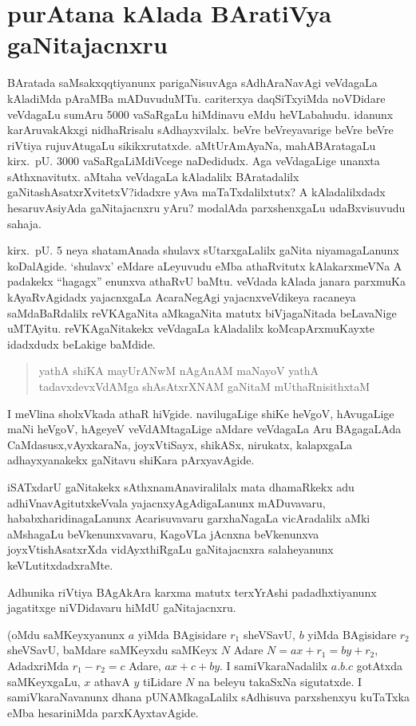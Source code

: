 \chapter{purAtana kAlada BAratiVya gaNitajacnxru}

 BAratada saMsakxqqtiyanunx parigaNisuvAga sAdhAraNavAgi veVdagaLa kAladiMda pAraMBa mADuvuduMTu. cariterxya daqSiTxyiMda noVDidare veVdagaLu sumAru {\rm 5000} vaSaRgaLu hiMdinavu eMdu heVLabahudu. idanunx karAruvakAkxgi nidhaRrisalu sAdhayx\-vilalx. beVre beVreyavarige beVre beVre riVtiya rujuvAtugaLu sikikxrutatxde. aMtU\break rAmAyaNa, mahABAratagaLu kirx.~pU. {\rm 3000} vaSaRgaLiMdiVcege naDedidudx. Aga veVdagaLige unanxta sAthxnavitutx. aMtaha veVdagaLa kAladalilx BAratadalilx gaNitashAsatxrXvitetxV?\break idadxre yAva maTaTxdalilxtutx? A kAladalilxdadx hesaruvAsiyAda gaNitajacnxru yAru? modalAda parxshenxgaLu udaBxvisuvudu sahaja.

kirx.~pU. {\rm 5} neya shatamAnada shulavx sUtarxgaLalilx gaNita niyamagaLanunx koDalAgide. `shulavx' eMdare aLeyuvudu eMba athaRvitutx kAlakarxmeVNa A padakekx ``hagagx'' enunxva athaRvU baMtu. veVdada kAlada janara parxmuKa kAyaRvAgidadx yajacnxgaLa AcaraNegAgi yajacnxveVdikeya racaneya saMdaBaRdalilx reVKAgaNita aMkagaNita matutx biVja\-gaNitada beLavaNige uMTAyitu. reVKAgaNitakekx veVdagaLa kAladalilx koMca\break pArxmuKayxte idadxdudx beLakige baMdide.
\begin{verse}
yathA shiKA mayUrANwM nAgAnAM maNayoV yathA\\
tadavxdevxVdAMga shAsAtxrXNAM gaNitaM mUthaRnisithxtaM
\end{verse}

I meVlina sholxVkada athaR hiVgide. navilugaLige shiKe heVgoV, hAvugaLige maNi heVgoV, hAgeyeV veVdAMtagaLige aMdare veVdagaLa Aru BAgagaLAda CaMdasusx,\break vAyxkaraNa, joyxVtiSayx, shikASx, nirukatx, kalapxgaLa adhayxyanakekx gaNitavu shiKara pArxyavAgide.

iSATxdarU gaNitakekx sAthxnamAnaviralilalx mata dhamaRkekx adu adhiVnavAgitutx\break keVvala yajacnxyAgAdigaLanunx mADuvavaru, hababxharidinagaLanunx Acarisuvavaru garxhaNa\-gaLa vicAradalilx aMki aMshagaLu beVkenunxvavaru, KagoVLa jAcnxna beVkenunxva joyxVti\-shAsatxrXda vidAyxthiRgaLu gaNitajacnxra salaheyanunx keVLutitxdadxraMte.

Adhunika riVtiya BAgAkAra karxma matutx terxYrAshi padadhxtiyanunx jagatitxge niVDidavaru hiMdU gaNitajacnxru.

(oMdu saMKeyxyanunx $a$ yiMda BAgisidare $r_{1}$ sheVSavU, $b$ yiMda BAgisidare $r_{2}$ sheVSavU, baMdare saMKeyxdu saMKeyx $N$ Adare $N=ax+r_{1}=by+r_{2}$, AdadxriMda $r_{1}-r_{2}=c$ Adare, $ax+c+by$. I samiVkaraNadalilx $a. b. c$ gotAtxda saMKeyxgaLu, $x$ athavA $y$ tiLidare $N$ na beleyu takaSxNa sigutatxde. I samiVkaraNavanunx dhana pUNAMkagaLalilx sAdhisuva parxshenxyu kuTaTxka eMba hesariniMda parxKAyxtavAgide.

